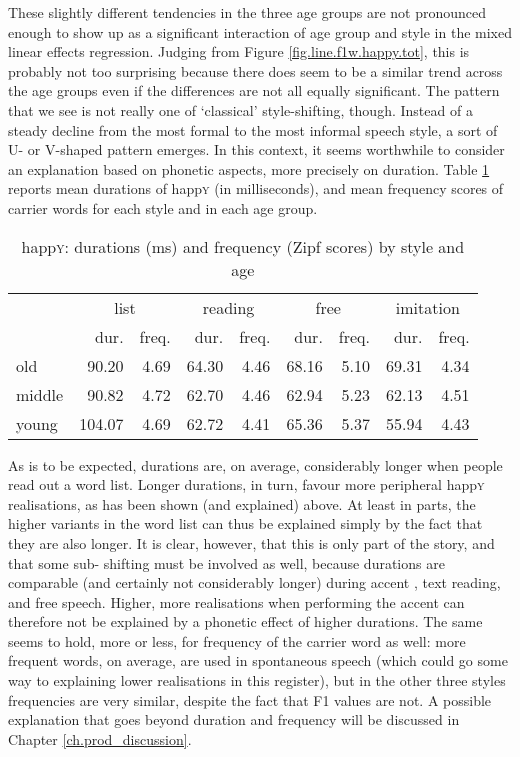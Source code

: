 These slightly different tendencies in the three age groups are not pronounced enough to show up as a significant interaction of age group and style in the mixed linear effects regression.
Judging from Figure \ref{fig.line.f1w.happy.tot}, this is probably not too surprising because there does seem to be a similar trend across the age groups even if the differences are not all equally significant.
The pattern that we see is not really one of `classical' style-shifting, though.
Instead of a steady decline from the most formal to the most informal speech style, a sort of U- or V-shaped pattern emerges.
In this context, it seems worthwhile to consider an explanation based on phonetic aspects, more precisely on duration.
Table \ref{tab.dur.style.happy} reports mean durations of happ\textsc{y} (in milliseconds), and mean frequency scores of carrier words for each style and in each age group.

\begin{table}[h!]
	\centering
	\caption{happ\textsc{y}: durations (ms) and frequency (Zipf scores) by style and age}
	\label{tab.dur.style.happy}
	\begin{tabular}{lrrrrrrrr}
		\hline
		& \multicolumn{2}{c}{list} & \multicolumn{2}{c}{reading} & \multicolumn{2}{c}{free} & \multicolumn{2}{c}{imitation}\\
		& dur. & freq. & dur. & freq. & dur. & freq. & dur. & freq.\\
		\hline
		old & 90.20 & 4.69 & 64.30 & 4.46 & 68.16 & 5.10 & 69.31 & 4.34\\
		middle & 90.82 & 4.72 & 62.70 & 4.46 & 62.94 & 5.23 & 62.13 & 4.51\\
		young & 104.07 & 4.69 & 62.72 & 4.41 & 65.36 & 5.37 & 55.94 & 4.43\\
		\hline
	\end{tabular}
\end{table}

As is to be expected,  durations are, on average, considerably longer when people read out a word list.
Longer  durations, in turn, favour more peripheral happ\textsc{y} realisations, as has been shown (and explained) above.
At least in parts, the higher variants in the word list can thus be explained simply by the fact that they are also longer.
It is clear, however, that this is only part of the story, and that some sub- shifting must be involved as well, because  durations are comparable (and certainly not considerably longer) during accent , text reading, and free speech.
Higher, more  realisations when performing the accent can therefore not be explained by a phonetic effect of higher  durations.
The same seems to hold, more or less, for frequency of the carrier word as well: more frequent words, on average, are used in spontaneous speech (which could go some way to explaining lower realisations in this register), but in the other three styles frequencies are very similar, despite the fact that F1 values are not.
A possible explanation that goes beyond duration and frequency will be discussed in Chapter \ref{ch.prod_discussion}.

